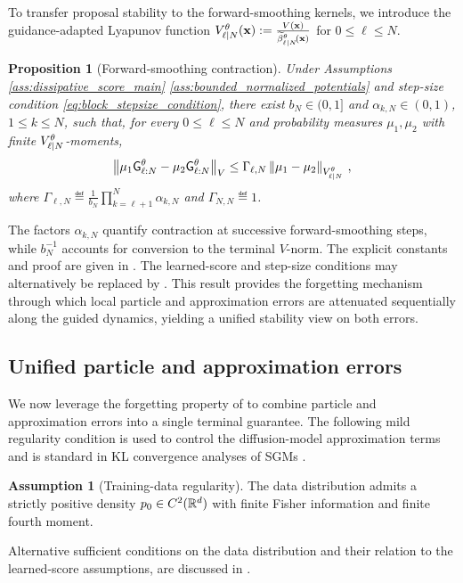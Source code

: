 \documentclass[11pt]{article}
\theoremstyle{plain}
\newtheorem{proposition}[theorem]{Proposition}
\theoremstyle{definition}
\newtheorem{assumption}[theorem]{Assumption}
\theoremstyle{remark}
\begin{document}
To transfer proposal stability to the forward-smoothing kernels, we introduce the guidance-adapted Lyapunov function $\twistedlyap{\ell}{N}[\theta](\x) \eqdef
\frac{V(\x)}{\normbackwardfun{\ell}{N}[\theta][\x]}$ for $0\le\ell\le N$. 
\begin{proposition}[Forward-smoothing contraction] \label{lem:finite_horizon_forward_smoothing_stability_main}
Under Assumptions \ref{ass:dissipative_score_main} \ref{ass:bounded_normalized_potentials}
and step-size condition \eqref{eq:block_stepsize_condition}, there exist
$b_N\in(0,1]$ and $\alpha_{k,N}\in(0,1)$, $1\le k\le N$, such that,
for every $0\le\ell\le N$ and probability measures $\mu_1,\mu_2$
with finite $\twistedlyap{\ell}{N}[\theta]$-moments,
\begin{equation}
\label{eq:guided_stability_main}
\vnorm[ \mu_1\prodfsmk{\ell}{N}[\theta] - \mu_2\prodfsmk{\ell}{N}[\theta] ][V] \le \Gamma_{\ell,N} \vnorm[ \mu_1-\mu_2 ][\twistedlyap{\ell}{N}[\theta]] \eqsp,
\end{equation}
where $\Gamma_{\ell,N} \eqdef \tfrac{1}{b_N} \prod_{k=\ell+1}^{N}\alpha_{k,N}$ and $\Gamma_{N,N}\eqdef1$. 
\end{proposition}
%
The factors $\alpha_{k,N}$ quantify contraction at successive forward-smoothing steps, while $b_N^{-1}$ accounts for conversion to the terminal $V$-norm. The explicit constants and proof are given in . The learned-score and step-size conditions may alternatively be replaced by . This result provides the forgetting mechanism through which local particle and approximation errors are attenuated sequentially along the guided dynamics, yielding a unified stability view on both errors.

\subsection{Unified particle and approximation errors}

We now leverage the forgetting property of   to combine particle and approximation errors into a single terminal guarantee. The following mild regularity condition is used to control the diffusion-model approximation terms and is standard in KL convergence analyses of SGMs \citep{conforti_kl}.
\begin{assumption}[Training-data regularity]
\label{ass:sgm_fisher_regularity_main}
    The data distribution admits a strictly positive density
    $p_0\in C^2(\mathbb{R}^d)$ with finite Fisher information and finite
    fourth moment. 
\end{assumption}
%
Alternative sufficient conditions on the data distribution and their relation to the learned-score assumptions, are discussed in .
\end{document}

